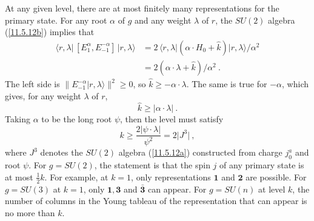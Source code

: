 At any given level, there are at most finitely many representations for the primary state. For any root $\alpha$ of $g$ and any weight $\lambda$ of $r$, the $SU(2)$ algebra (\ref{11.5.12b}) implies that
\begin{align}
	\langle r,\lambda \rvert\, [E_{1}^{\alpha},E_{-1}^{-\alpha}]\,\lvert r,\lambda\rangle 
	&= 2\,\langle r,\lambda \rvert (\alpha \cdot H_{0}+\hat{k})\rvert r,\lambda \rangle/\alpha^{2} \nonumber \\
	&=2(\alpha \cdot \lambda + \hat{k})/\alpha^{2} \:. \label{11.5.42}
\end{align}
The left side is $\lVert E_{-1}^{-\alpha}\lvert r,\lambda\rangle \rVert^{2}\geq 0$, so $\hat{k}\geq -\alpha\cdot \lambda$. The same is true for $-\alpha$, which gives, for any weight $\lambda$ of $r$,
\begin{equation}
	\hat{k} \geq \lvert \alpha \cdot \lambda \rvert \:. \label{11.5.43}
\end{equation}
Taking $\alpha$ to be the long root $\psi$, then the level must satisfy
\begin{equation}
	k \geq \frac{2\lvert \psi \cdot \lambda \rvert}{\psi^{2}} = 2\lvert J^{3}\rvert \:, \label{11.5.44}
\end{equation}
where $J^{3}$ denotes the $SU(2)$ algebra (\ref{11.5.12a}) constructed from charge $j_{0}^{a}$ and root $\psi$. For $g=SU(2)$, the statement is that the spin $j$ of any primary state is at most $\tfrac{1}{2}k$. For example, at $k=1$, only representations $\mathbf{1}$ and $\mathbf{2}$ are possible. For $g=SU(3)$ at $k=1$, only $\mathbf{1}, \mathbf{3}$ and $\bar{\mathbf{3}}$ can appear. For $g=SU(n)$ at level $k$, the number of columns in the Young tableau of the representation that can appear is no more than $k$.
